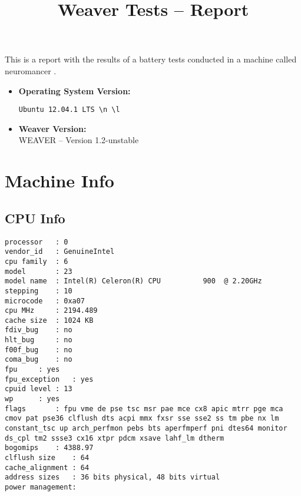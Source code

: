 \documentclass{article}
\title{Weaver Tests -- Report}
\begin{document}
\maketitle
This is a report with the results of a battery
tests conducted in a machine called 
neuromancer
.
\begin{itemize}
\item
\textbf{Operating System Version: }
\begin{verbatim}
Ubuntu 12.04.1 LTS \n \l

\end{verbatim}
\item
\textbf{Weaver Version: }\\
WEAVER -- Version 1.2-unstable
\end{itemize}
\section{Machine Info}
\subsection{CPU Info}
\begin{verbatim}
processor	: 0
vendor_id	: GenuineIntel
cpu family	: 6
model		: 23
model name	: Intel(R) Celeron(R) CPU          900  @ 2.20GHz
stepping	: 10
microcode	: 0xa07
cpu MHz		: 2194.489
cache size	: 1024 KB
fdiv_bug	: no
hlt_bug		: no
f00f_bug	: no
coma_bug	: no
fpu		: yes
fpu_exception	: yes
cpuid level	: 13
wp		: yes
flags		: fpu vme de pse tsc msr pae mce cx8 apic mtrr pge mca cmov pat pse36 clflush dts acpi mmx fxsr sse sse2 ss tm pbe nx lm constant_tsc up arch_perfmon pebs bts aperfmperf pni dtes64 monitor ds_cpl tm2 ssse3 cx16 xtpr pdcm xsave lahf_lm dtherm
bogomips	: 4388.97
clflush size	: 64
cache_alignment	: 64
address sizes	: 36 bits physical, 48 bits virtual
power management:

\end{verbatim}
\end{document}
